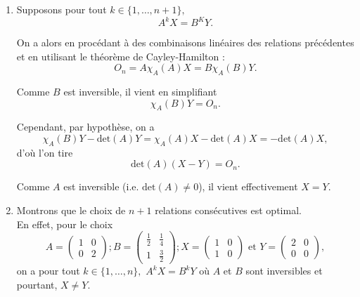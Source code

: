 \begin{enumerate}
\item Supposons pour tout $k\in\{1,\ldots,n+1\},$ $$A^{k}X=B^{K}Y.$$

On a alors en procédant à des combinaisons linéaires des relations précédentes et en utilisant le théorème de Cayley-Hamilton :  $$O_{n}=A\chi_{A}(A)X=B\chi_{A}(B)Y.$$

Comme $B$ est inversible, il vient en simplifiant $$\chi_{A}(B)Y=O_{n}.$$

Cependant, par hypothèse, on a $$\chi_{A}(B)Y-\mbox{det}(A)Y=\chi_{A}(A)X-\mbox{det}(A)X=-\mbox{det}(A)X,$$ d'où l'on tire $$\mbox{det}(A)(X-Y)=O_{n}.$$

Comme $A$ est inversible (i.e. $\mbox{det}(A)\neq 0$), il vient effectivement $\displaystyle X=Y.$

\item Montrons que le choix de $n+1$ relations consécutives est optimal.\\

En effet, pour le choix $$A= \left( \begin{array}{ll}
1 & 0\\
0 & 2
\end{array} \right); B= \left( \begin{array}{ll}
\frac{1}{2} & \frac{1}{4}\\
1 & \frac{3}{2}
\end{array}\right); X= \left( \begin{array}{ll}
1 & 0\\
1 & 0
\end{array}\right) \mbox{ et }  Y= \left( \begin{array}{ll}
2 & 0\\
0 & 0
\end{array}\right),$$ on a pour tout $k\in\{1,\ldots,n\},$ $\displaystyle A^{k}X=B^{k}Y$ où $A$ et $B$ sont inversibles et pourtant, $X\neq Y.$


\end{enumerate}